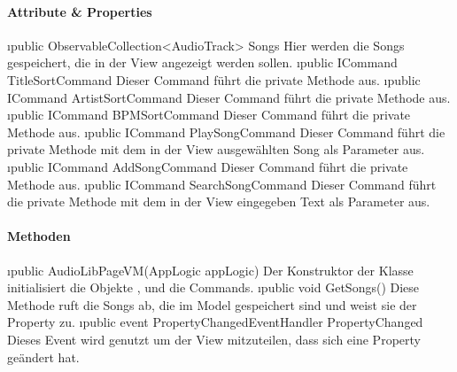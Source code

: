 \documentclass[../entwurf.tex]{subfiles}
\begin{document}
\paragraph{Attribute \& Properties}
\begin{itemize}
	\i{public ObservableCollection<AudioTrack> Songs} Hier werden die Songs gespeichert, die in der View angezeigt werden sollen.
	\i{public ICommand TitleSortCommand} Dieser Command führt die private Methode  aus. 
	\i{public ICommand ArtistSortCommand} Dieser Command führt die private Methode  aus. 
	\i{public ICommand BPMSortCommand} Dieser Command führt die private Methode  aus. 
	\i{public ICommand PlaySongCommand} Dieser Command führt die private Methode  mit dem in der View ausgewählten Song als Parameter aus. 
	\i{public ICommand AddSongCommand} Dieser Command führt die private Methode  aus. 
	\i{public ICommand SearchSongCommand} Dieser Command führt die private Methode  mit dem in der View eingegeben Text als Parameter aus. 
\end{itemize}
\paragraph{Methoden}
\begin{itemize}
	\i{public AudioLibPageVM(AppLogic appLogic)} Der Konstruktor der Klasse initialisiert die Objekte ,  und die Commands.
	\i{public void GetSongs()} Diese Methode ruft die Songs ab, die im Model gespeichert sind und weist sie der Property  zu.
	\i{public event PropertyChangedEventHandler PropertyChanged} Dieses Event wird genutzt um der View mitzuteilen, dass sich eine Property geändert hat.
\end{itemize}
\end{document}

